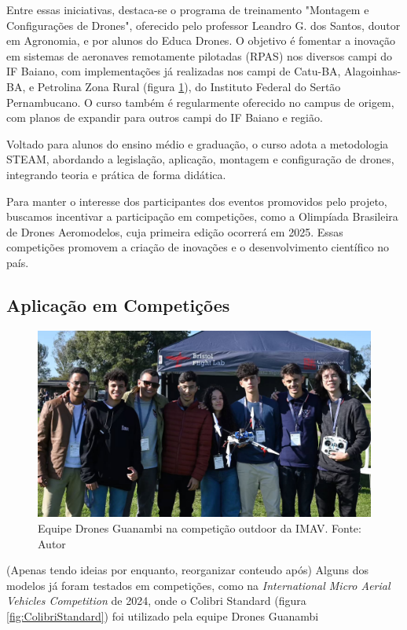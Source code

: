 \documentclass[conference]{IEEEtran}
\begin{document}
Entre essas iniciativas, destaca-se o programa de treinamento "Montagem e Configurações de Drones", oferecido pelo professor Leandro G. dos Santos, doutor em Agronomia, e por alunos do Educa Drones. O objetivo é fomentar a inovação em sistemas de aeronaves remotamente pilotadas (RPAS) nos diversos campi do IF Baiano, com implementações já realizadas nos campi de Catu-BA, Alagoinhas-BA, e Petrolina Zona Rural (figura \ref{fig:petrolina}), do Instituto Federal do Sertão Pernambucano. O curso também é regularmente oferecido no campus de origem, com planos de expandir para outros campi do IF Baiano e região.

Voltado para alunos do ensino médio e graduação, o curso adota a metodologia STEAM, abordando a legislação, aplicação, montagem e configuração de drones, integrando teoria e prática de forma didática.

Para manter o interesse dos participantes dos eventos promovidos pelo projeto, buscamos incentivar a participação em competições, como a Olimpíada Brasileira de Drones Aeromodelos, cuja primeira edição ocorrerá em 2025. Essas competições promovem a criação de inovações e o desenvolvimento científico no país.

\subsection{Aplicação em Competições}

\begin{figure}[!htb]
    \centering
    \includegraphics[scale=0.30]{img/imav2024.png} 
    \caption{Equipe Drones Guanambi na competição outdoor da IMAV. Fonte: Autor}
    \label{fig:petrolina}
\end{figure}

(Apenas tendo ideias por enquanto, reorganizar conteudo após)
Alguns dos modelos já foram testados em competições, como na \textit{International Micro Aerial Vehicles Competition} de 2024, onde o Colibri Standard (figura \ref{fig:ColibriStandard}) foi utilizado pela equipe Drones Guanambi
\end{document}

